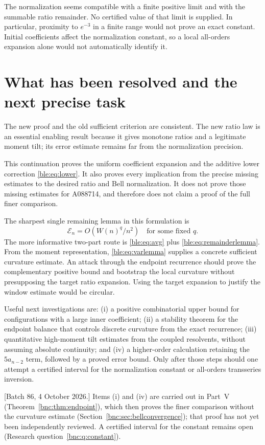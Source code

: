 \documentclass[11pt]{article}
\numberwithin{equation}{section}
\theoremstyle{definition}
\theoremstyle{remark}
\begin{document}
The normalization seems compatible with a finite positive limit and with
the summable ratio remainder. No certified value of that limit is
supplied. In particular, proximity to $e^{-3}$ in a finite range would not
prove an exact constant. Initial coefficients affect the normalization
constant, so a local all-orders expansion alone would not automatically
identify it.

\section{What has been resolved and the next precise task}\label{ble:sec:resolved}
The new proof and the old sufficient criterion are consistent. The new
ratio law is an essential enabling result because it gives monotone
ratios and a legitimate moment tilt; its error estimate remains far from
the normalization precision.

This continuation proves the uniform coefficient expansion and the
additive lower correction \eqref{ble:eq:lower}. It also proves every
implication from the precise missing estimates to the desired ratio and
Bell normalization. It does not prove those missing estimates for A088714,
and therefore does not claim a proof of the full finer comparison.

The sharpest single remaining lemma in this formulation is
\[
 \boxed{\mathcal E_n=O(W(n)^q/n^2)\quad\text{for some fixed }q.}
\]
The more informative two-part route is \eqref{ble:eq:avg} plus
\eqref{ble:eq:remainderlemma}. From the moment representation,
\eqref{ble:eq:varlemma} supplies a concrete sufficient curvature estimate.
An attack through the endpoint recurrence should prove the complementary
positive bound and bootstrap the local curvature without presupposing the
target ratio expansion. Using the target expansion to justify the window
estimate would be circular.

Useful next investigations are: (i) a positive combinatorial upper bound
for configurations with a large inner coefficient; (ii) a stability
theorem for the endpoint balance that controls discrete curvature from the
exact recurrence; (iii) quantitative high-moment tilt estimates from the
coupled resolvents, without assuming absolute continuity; and (iv) a
higher-order calculation retaining the $5a_{n-2}$ term, followed by a
proved error bound. Only after those steps should one attempt a certified
interval for the normalization constant or all-orders transseries
inversion.

[Batch 86, 4 October 2026.] Items (i) and (iv) are carried out in Part~V
(Theorem~\ref{bnc:thm:endpoint}), which then proves the finer comparison
without the curvature estimate (Section~\ref{bnc:sec:bellconvergence});
that proof has not yet been independently reviewed. A certified interval
for the constant remains open (Research question~\ref{bnc:q:constant}).
\end{document}

